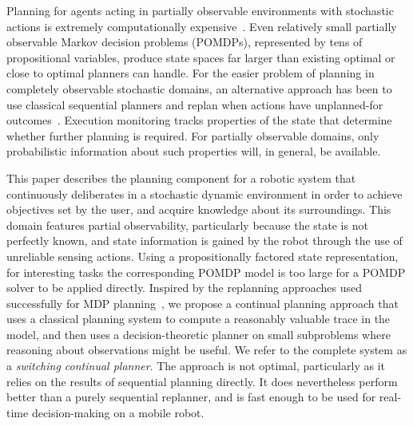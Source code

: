 

Planning for agents acting in partially observable environments with
stochastic actions is extremely computationally
expensive~\cite{mdp-complexity}. Even relatively small partially
observable Markov decision problems (POMDPs), represented by tens of
propositional variables, produce state spaces far larger than existing
optimal or close to optimal planners can handle. For the easier
problem of planning in completely observable stochastic domains, an
alternative approach has been to use classical sequential planners and
replan when actions have unplanned-for outcomes~\cite{yoon:etal:2007}.
Execution monitoring tracks properties of the state that determine
whether further planning is required. For partially observable
domains, only probabilistic information about such properties will, in
general, be available.


This paper describes the planning component for a robotic system that
continuously deliberates in a stochastic dynamic environment in order
to achieve objectives set by the user, and acquire knowledge about its
surroundings. This domain features partial observability, particularly
because the state is not perfectly known, and state information is
gained by the robot through the use of unreliable sensing
actions. Using a propositionally factored state representation, for
interesting tasks the corresponding POMDP model is too large for a
POMDP solver to be applied directly. Inspired by the replanning
approaches used successfully for MDP
planning~\cite{yoon:etal:2007,yoon:etal:2008}, we propose a continual
planning approach that uses a classical planning system to compute a
reasonably valuable trace in the model, and then uses a
decision-theoretic planner on small subproblems where reasoning about
observations might be useful. We refer to the complete system as a
{\em switching continual planner}. The approach is not optimal,
particularly as it relies on the results of sequential planning
directly. It does nevertheless perform better than a purely sequential
replanner, and is fast enough to be used for real-time decision-making
on a mobile robot.




